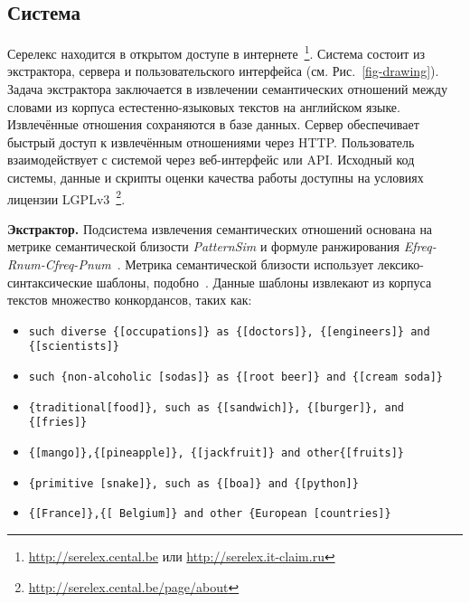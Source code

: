 \documentclass[a4paper,10pt,twoside]{article}
\begin{document}
\subsection{Система}

Серелекс находится в открытом доступе в интернете~\footnote{\url{http://serelex.cental.be} или \url{http://serelex.it-claim.ru} }.
Система состоит из экстрактора, сервера и пользовательского интерфейса (см. Рис.~\ref{fig-drawing}). Задача экстрактора заключается в извлечении семантических отношений между словами из корпуса естестенно-языковых текстов на английском языке. Извлечённые отношения сохраняются в базе данных. Сервер обеспечивает быстрый доступ к извлечённым отношениями через HTTP. Пользователь взаимодействует с системой через веб-интерфейс или API. Исходный код системы, данные и скрипты оценки качества работы доступны на условиях лицензии LGPLv3~\footnote{ \url{http://serelex.cental.be/page/about} }.


\textbf{Экстрактор.} Подсистема извлечения семантических отношений основана на метрике семантической близости \textit{PatternSim} и формуле ранжирования \textit{Efreq-Rnum-Cfreq-Pnum}~\cite{panchenko2012konvens}. Метрика семантической близости использует лексико-синтаксические шаблоны, подобно~\cite{hearst1992}. Данные шаблоны извлекают из корпуса текстов множество конкордансов, таких как: 

\begin{itemize}
\footnotesize
\item \texttt{such diverse \{[occupations]\} as \{[doctors]\}, \{[engineers]\} and \{[scientists]\}}

\item \texttt{such \{non-alcoholic [sodas]\} as \{[root beer]\} and \{[cream 
 soda]\}}
 
\item \texttt{\{traditional[food]\}, such as \{[sandwich]\}, \{[burger]\}, and \{[fries]\}}

\item \texttt{\{[mango]\},\{[pineapple]\}, \{[jackfruit]\} and other\{[fruits]\}}

\item \texttt{\{primitive [snake]\}, such as \{[boa]\} and \{[python]\}}
\item \texttt{\{[France]\},\{[ Belgium]\} and other \{European [countries]\}}
\end{itemize}
\end{document}
